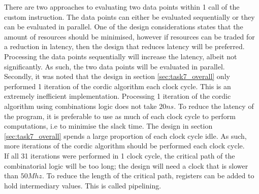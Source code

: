 There are two approaches to evaluating two data points within 1 call of the custom instruction. The data points can either be evaluated sequentially or they can be evaluated in parallel. One of the design considerations states that the amount of resources should be minimised, however if resources can be traded for a reduction in latency, then the design that reduces latency will be preferred. Processing the data points sequentially will increase the latency, albeit not significantly. As such, the two data points will be evaluated in parallel.\\

Secondly, it was noted that the design in section \ref{sec:task7_overall} only performed 1 iteration of the cordic algorithm each clock cycle. This is an extremely inefficient implementation. Processing 1 iteration of the cordic algorithm using combinations logic does not take $20ns$. To reduce the latency of the program, it is preferable to use as much of each clock cycle to perform computations, i.e to minimise the slack time. The design in section \ref{sec:task7_overall} spends a large proportion of each clock cycle idle. As such, more iterations of the cordic algorithm should be performed each clock cycle. \\

If all 31 iterations were performed in 1 clock cycle, the critical path of the combinatorial logic will be too long; the design will need a clock that is slower than $50Mhz$. To reduce the length of the critical path, registers can be added to hold intermediary values. This is called pipelining. 
 